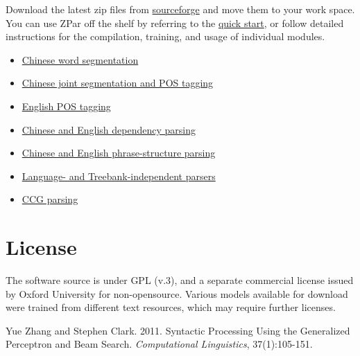 \documentclass[12pt]{article}
\begin{document}
Download the latest zip files from \href{http://sourceforge.net/projects/zpar/}{sourceforge} and move them to your work space.
\\
You can use ZPar off the shelf by referring to the \href{doc/qs.html}{quick start}, or follow detailed instructions for the compilation, training, and usage of individual modules.
\begin{itemize}
\item \href{doc/segmentor.html}{Chinese word segmentation}
\item \href{doc/joint_seg_tag.html}{Chinese joint segmentation and POS tagging}
\item \href{doc/eng_tagger.html}{English POS tagging}
\item \href{doc/deppar.html}{Chinese and English dependency parsing}
\item  \href{doc/conparser.html}{Chinese and English phrase-structure parsing}
\item \href{doc/independent.html}{Language- and Treebank-independent parsers}
\item \href{doc/ccg.html}{CCG parsing}
\end{itemize}

\section{License}

The software source is under GPL (v.3), and a separate commercial license
issued by Oxford University for non-opensource. Various models available for
download were trained from different text resources, which may require further
licenses.

\begin{thebibliography}{99}
Yue Zhang and Stephen Clark. 2011. Syntactic Processing Using the Generalized Perceptron and Beam Search. \textit{Computational Linguistics}, 37(1):105-151.
\end{thebibliography}
\end{document}
